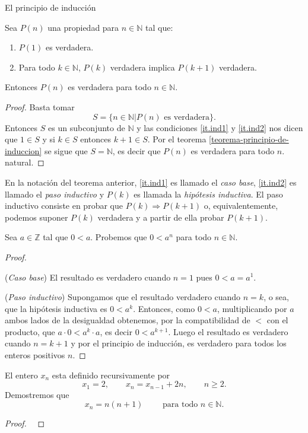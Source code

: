 \begin{section}{El principio de inducción}
\begin{teorema}\label{induccion2} Sea $P(n)$ una propiedad para $n \in \mathbb N$ tal que:
\begin{enumerate}[label=\textit{\alph*)}]
\item\label{it.ind1} $P(1)$ es verdadera.
\item\label{it.ind2} Para todo $k \in \mathbb N$, $P(k)$ verdadera implica $P(k + 1)$ verdadera.
\end{enumerate}
Entonces $P(n)$ es verdadera para todo $n \in \mathbb N$.
\end{teorema}
\begin{proof} Basta tomar
$$S = \{n \in \mathbb N| P(n) \text{ es verdadera} \}.$$
Entonces $S$ es un subconjunto de $\mathbb N$ y las condiciones \ref{it.ind1} y \ref{it.ind2} nos dicen que $1 \in S$ y  si $ k \in S$ entonces $k+1\in S$. Por el teorema \ref{teorema-principio-de-induccion} se sigue que $S= \mathbb N$, es decir que $P(n)$ es verdadera para todo $n$.
natural.
\end{proof}


En la notación del teorema anterior, \ref{it.ind1} es llamado  el \textit{caso base}, \ref{it.ind2} es llamado el  \textit{paso inductivo} y $P(k)$ es llamada la \textit{hipótesis inductiva}. El paso inductivo  consiste en probar que $P(k) \Rightarrow P(k + 1)$ o, equivalentemente, podemos suponer $P(k)$ verdadera y a partir de ella probar $P(k + 1)$. 


\begin{ejemplo}\label{ejemplo141} Sea $a\in \mathbb Z$ tal que $0<a$. Probemos que $0<a^n$ para todo $n \in \mathbb N$.
\end{ejemplo}
\begin{proof}
\

\noindent (\textit{Caso  base}) El resultado es verdadero
cuando $n=1$ pues $ 0 < a=a^1$.

\noindent (\textit{Paso  inductivo})
 Supongamos que el resultado verdadero cuando $n=k$, o sea, que la hipótesis inductiva es $0 < a^k$. Entonces, como $0<a$, multiplicando por $a$ ambos lados de la desigualdad obtenemos, por la compatibilidad de $<$ con el producto, que $a\cdot 0 < a^k \cdot a$, es decir $0<a^{k+1}$.  Luego el resultado es verdadero cuando $n=k+1$ y por el principio de inducción, es verdadero para todos los enteros positivos $n$.
\end{proof}

\begin{ejemplo*} El entero $x_n$ esta definido recursivamente por
$$
x_1=2, \qquad x_n=x_{n-1} +2n, \qquad n\ge 2.
$$
Demostremos que
$$
x_n = n(n+1) \qquad \text{ para todo } n\in \mathbb N.
$$
\end{ejemplo*}
\begin{proof}
\    


\end{proof}
\end{section}
